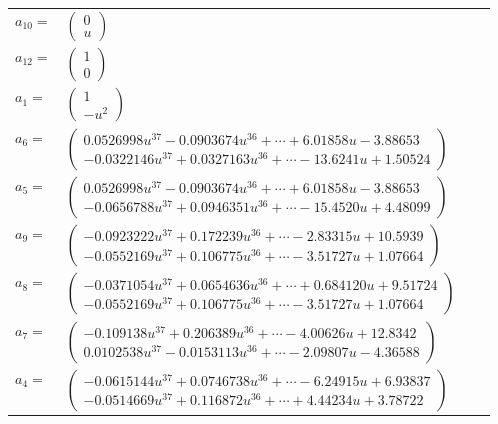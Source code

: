 \documentclass[1p]{elsarticle_modified}
\theoremstyle{definition}
\begin{document}
\begin{tabular}{m{7pt} m{180pt} m{7pt} m{180pt} }
\flushright $a_{10}=$&$\begin{pmatrix}0\\u\end{pmatrix}$ \\
\flushright $a_{12}=$&$\begin{pmatrix}1\\0\end{pmatrix}$ \\
\flushright $a_{1}=$&$\begin{pmatrix}1\\- u^2\end{pmatrix}$ \\
\flushright $a_{6}=$&$\begin{pmatrix}0.0526998 u^{37}-0.0903674 u^{36}+\cdots+6.01858 u-3.88653\\-0.0322146 u^{37}+0.0327163 u^{36}+\cdots-13.6241 u+1.50524\end{pmatrix}$ \\
\flushright $a_{5}=$&$\begin{pmatrix}0.0526998 u^{37}-0.0903674 u^{36}+\cdots+6.01858 u-3.88653\\-0.0656788 u^{37}+0.0946351 u^{36}+\cdots-15.4520 u+4.48099\end{pmatrix}$ \\
\flushright $a_{9}=$&$\begin{pmatrix}-0.0923222 u^{37}+0.172239 u^{36}+\cdots-2.83315 u+10.5939\\-0.0552169 u^{37}+0.106775 u^{36}+\cdots-3.51727 u+1.07664\end{pmatrix}$ \\
\flushright $a_{8}=$&$\begin{pmatrix}-0.0371054 u^{37}+0.0654636 u^{36}+\cdots+0.684120 u+9.51724\\-0.0552169 u^{37}+0.106775 u^{36}+\cdots-3.51727 u+1.07664\end{pmatrix}$ \\
\flushright $a_{7}=$&$\begin{pmatrix}-0.109138 u^{37}+0.206389 u^{36}+\cdots-4.00626 u+12.8342\\0.0102538 u^{37}-0.0153113 u^{36}+\cdots-2.09807 u-4.36588\end{pmatrix}$ \\
\flushright $a_{4}=$&$\begin{pmatrix}-0.0615144 u^{37}+0.0746738 u^{36}+\cdots-6.24915 u+6.93837\\-0.0514669 u^{37}+0.116872 u^{36}+\cdots+4.44234 u+3.78722\end{pmatrix}$ \\

\end{tabular}
\end{document}
